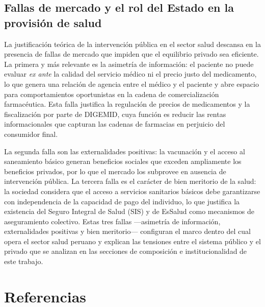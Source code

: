\documentclass[12pt]{article}
\begin{document}
\subsection{Fallas de mercado y el rol del Estado en la provisión de salud}

La justificación teórica de la intervención pública en el sector salud descansa en la presencia de
fallas de mercado que impiden que el equilibrio privado sea eficiente. La primera y más relevante es
la asimetría de información: el paciente no puede evaluar \textit{ex ante} la calidad del servicio
médico ni el precio justo del medicamento, lo que genera una relación de agencia entre el médico y
el paciente y abre espacio para comportamientos oportunistas en la cadena de comercialización
farmacéutica. Esta falla justifica la regulación de precios de medicamentos y la fiscalización por
parte de DIGEMID, cuya función es reducir las rentas informacionales que capturan las cadenas de
farmacias en perjuicio del consumidor final.

La segunda falla son las externalidades positivas: la vacunación y el acceso al saneamiento básico
generan beneficios sociales que exceden ampliamente los beneficios privados, por lo que el mercado
los subprovee en ausencia de intervención pública. La tercera falla es el carácter de bien meritorio
de la salud: la sociedad considera que el acceso a servicios sanitarios básicos debe garantizarse con
independencia de la capacidad de pago del individuo, lo que justifica la existencia del Seguro
Integral de Salud (SIS) y de EsSalud como mecanismos de aseguramiento colectivo. Estas tres
fallas ---asimetría de información, externalidades positivas y bien meritorio--- configuran el marco
dentro del cual opera el sector salud peruano y explican las tensiones entre el sistema público y el
privado que se analizan en las secciones de composición e institucionalidad de este trabajo.

\section*{Referencias}
\end{document}
